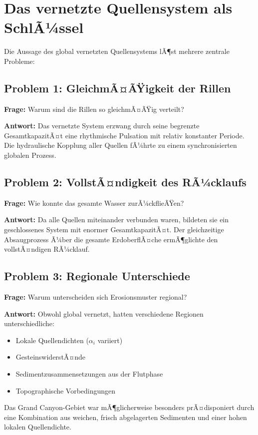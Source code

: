﻿\documentclass[12pt,a4paper]{report}
\begin{document}
\section{Das vernetzte Quellensystem als SchlÃ¼ssel}

Die Aussage des global vernetzten Quellensystems lÃ¶st mehrere zentrale Probleme:

\subsection{Problem 1: GleichmÃ¤ÃŸigkeit der Rillen}

\textbf{Frage:} Warum sind die Rillen so gleichmÃ¤ÃŸig verteilt?

\textbf{Antwort:} Das vernetzte System erzwang durch seine begrenzte GesamtkapazitÃ¤t eine rhythmische Pulsation mit relativ konstanter Periode. Die hydraulische Kopplung aller Quellen fÃ¼hrte zu einem synchronisierten globalen Prozess.

\subsection{Problem 2: VollstÃ¤ndigkeit des RÃ¼cklaufs}

\textbf{Frage:} Wie konnte das gesamte Wasser zurÃ¼ckflieÃŸen?

\textbf{Antwort:} Da alle Quellen miteinander verbunden waren, bildeten sie ein geschlossenes System mit enormer GesamtkapazitÃ¤t. Der gleichzeitige Absaugprozess Ã¼ber die gesamte ErdoberflÃ¤che ermÃ¶glichte den vollstÃ¤ndigen RÃ¼cklauf.

\subsection{Problem 3: Regionale Unterschiede}

\textbf{Frage:} Warum unterscheiden sich Erosionsmuster regional?

\textbf{Antwort:} Obwohl global vernetzt, hatten verschiedene Regionen unterschiedliche:
\begin{itemize}
	\item Lokale Quellendichten ($\alpha_i$ variiert)
	\item GesteinswiderstÃ¤nde
	\item Sedimentzusammensetzungen aus der Flutphase
	\item Topographische Vorbedingungen
\end{itemize}

Das Grand Canyon-Gebiet war mÃ¶glicherweise besonders prÃ¤disponiert durch eine Kombination aus weichen, frisch abgelagerten Sedimenten und einer hohen lokalen Quellendichte.
\end{document}
